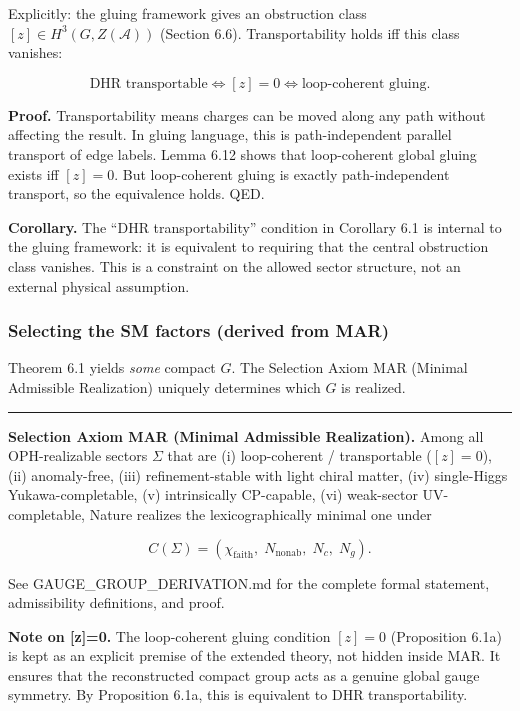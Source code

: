 \documentclass[11pt,a4paper]{article}
\theoremstyle{remark}
\begin{document}
Explicitly: the gluing framework gives an obstruction class
\([z] \in H^3(G, Z(\mathcal{A}))\) (Section 6.6). Transportability holds iff
this class vanishes:

\[
\text{DHR transportable} \iff [z] = 0 \iff \text{loop-coherent gluing}.
\]

\textbf{Proof.} Transportability means charges can be moved along any path
without affecting the result. In gluing language, this is path-independent
parallel transport of edge labels. Lemma 6.12 shows that loop-coherent
global gluing exists iff \([z] = 0\). But loop-coherent gluing is exactly
path-independent transport, so the equivalence holds. QED.

\textbf{Corollary.} The ``DHR transportability'' condition in Corollary 6.1 is
internal to the gluing framework: it is equivalent to requiring that the
central obstruction class vanishes. This is a constraint on the allowed
sector structure, not an external physical assumption.

\subsubsection{Selecting the SM factors (derived from MAR)}\label{selecting-the-sm-factors-derived-from-mar}

Theorem 6.1 yields \emph{some} compact \(G\). The Selection Axiom MAR (Minimal
Admissible Realization) uniquely determines which \(G\) is realized.

\begin{center}\rule{0.5\linewidth}{0.5pt}\end{center}

\textbf{Selection Axiom MAR (Minimal Admissible Realization).} Among all
OPH-realizable sectors \(\Sigma\) that are (i) loop-coherent / transportable
(\([z]=0\)), (ii) anomaly-free, (iii) refinement-stable with light chiral
matter, (iv) single-Higgs Yukawa-completable, (v) intrinsically CP-capable,
(vi) weak-sector UV-completable, Nature realizes the lexicographically
minimal one under

\[C(\Sigma) = (\chi_{\mathrm{faith}},\; N_{\mathrm{nonab}},\; N_c,\; N_g).\]

See GAUGE\_GROUP\_DERIVATION.md for the complete formal statement, admissibility
definitions, and proof.

\textbf{Note on {[}z{]}=0.} The loop-coherent gluing condition \([z]=0\) (Proposition
6.1a) is kept as an explicit premise of the extended theory, not hidden inside
MAR. It ensures that the reconstructed compact group acts as a genuine global
gauge symmetry. By Proposition 6.1a, this is equivalent to DHR
transportability.
\end{document}
